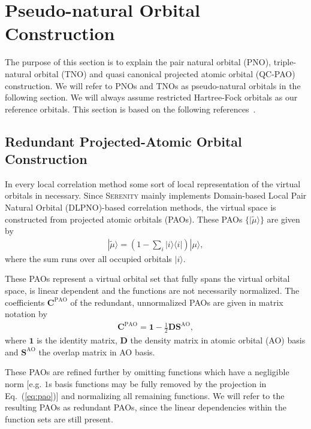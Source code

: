 \section{Pseudo-natural Orbital Construction}
The purpose of this section is to explain the pair natural orbital (PNO), triple-natural orbital (TNO) and
quasi canonical projected atomic orbital (QC-PAO) construction. We will refer to PNOs and TNOs as pseudo-natural
orbitals in the following section. We will always assume restricted Hartree-Fock orbitals as our reference orbitals.
This section is based on the following references~\cite{Pulay1983,Neese2009b,Riplinger2013a}.

\subsection{Redundant Projected-Atomic Orbital Construction}
In every local correlation method some sort of local representation of the virtual orbitals in necessary.
Since \textsc{Serenity} mainly implements Domain-based Local Pair Natural Orbital (DLPNO)-based correlation
methods, the virtual space is constructed from projected atomic orbitals (PAOs).
These PAOs $\{|\tilde{\mu}\rangle\}$ are given by
\begin{align}
  |\tilde{\mu}\rangle = \left(1-\sum_{i} |i\rangle\langle i|\right)|\mu\rangle,
  \label{eq:pao}
\end{align}
where the sum runs over all occupied orbitals $|i\rangle$.

These PAOs represent a virtual orbital set that fully spans the virtual orbital space, is linear dependent
and the functions are not necessarily normalized.
The coefficients $\pmb{C}^{\mathrm{PAO}}$ of the redundant, unnormalized PAOs are given in matrix
notation by
\begin{align}
  \pmb{C}^{\mathrm{PAO}} = \pmb{1}-\frac{1}{2} \pmb{D}\pmb{S}^\mathrm{AO},
\end{align}
where $\pmb{1}$ is the identity matrix, $\pmb{D}$ the density matrix in atomic orbital (AO) basis and
$\pmb{S}^\mathrm{AO}$ the overlap matrix in AO basis.

These PAOs are refined further by omitting functions which have a negligible norm
[e.g. $1$s basis functions may be fully removed by the projection in Eq.~(\ref{eq:pao})]
and normalizing all remaining functions.
We will refer to the resulting PAOs as redundant PAOs, since the linear dependencies within the function
sets are still present.

